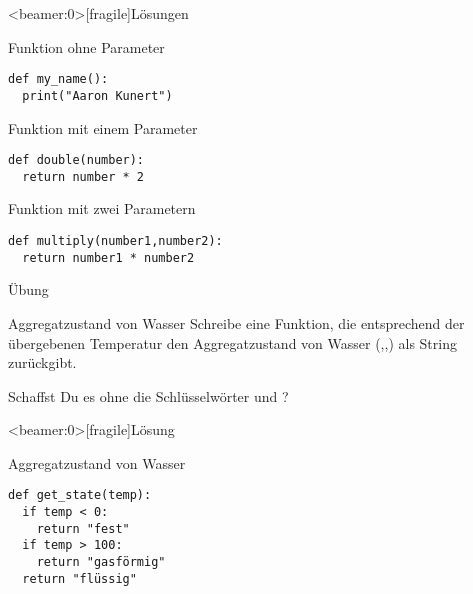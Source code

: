 \begin{frame}<beamer:0>[fragile]{Lösungen}

\begin{solutionblock}{Funktion ohne Parameter}
\begin{verbatim}
def my_name(): 
  print("Aaron Kunert")
\end{verbatim}
\end{solutionblock}

\vspace{12pt}

\begin{solutionblock}{Funktion mit einem Parameter}
\begin{verbatim}
def double(number): 
  return number * 2
\end{verbatim}
\end{solutionblock}

\vspace{12pt}

\begin{solutionblock}{Funktion mit zwei Parametern}
\begin{verbatim}
def multiply(number1,number2): 
  return number1 * number2
\end{verbatim}
\end{solutionblock}


\end{frame}

\begin{frame}{Übung}
\begin{block}{Aggregatzustand von Wasser}
\vspace{2pt}
Schreibe eine Funktion, die entsprechend der übergebenen Temperatur den Aggregatzustand von Wasser (,,) als String zurückgibt. 

Schaffst Du es ohne die Schlüsselwörter  und ? 
\end{block}
\end{frame}

\begin{frame}<beamer:0>[fragile]{Lösung}

\begin{solutionblock}{Aggregatzustand von Wasser}
\begin{verbatim}
def get_state(temp):
  if temp < 0:
    return "fest"
  if temp > 100:
    return "gasförmig"
  return "flüssig"
\end{verbatim}
\end{solutionblock}

\end{frame}


